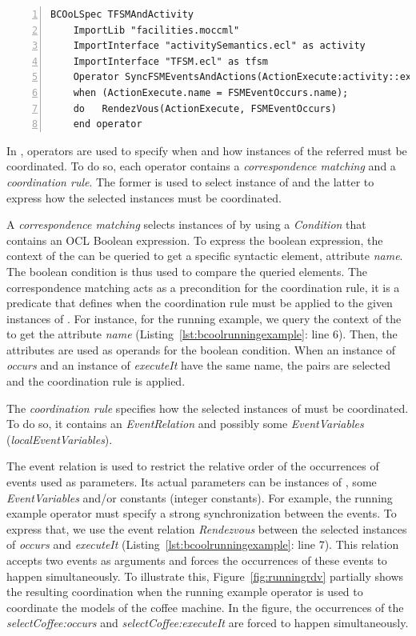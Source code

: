 	 
	\begin{lstlisting}[language=bcool,
	caption={\bcool specification of the running example operator between the TFSM and Activity languages},
	label={lst:bcoolrunningexample}, 
	basicstyle=\scriptsize\ttfamily, backgroundcolor=\color{LGrey}, numbers=left, xleftmargin=2pt]
	BCOoLSpec TFSMAndActivity
	ImportLib "facilities.moccml"
	ImportInterface "activitySemantics.ecl" as activity
	ImportInterface "TFSM.ecl" as tfsm
	Operator SyncFSMEventsAndActions(ActionExecute:activity::executeIt, FSMEventOccurs:tfsm::occurs)
	when (ActionExecute.name = FSMEventOccurs.name);
	do   RendezVous(ActionExecute, FSMEventOccurs)
	end operator
	\end{lstlisting}
	
In \bcool, operators are used to specify when and how instances of the referred \dse must be coordinated. To do so, each operator contains a \emph{correspondence matching} and a \emph{coordination rule}. The former is used to select instance of \dse and the latter to express how the selected instances must be coordinated. 
	
A \emph{correspondence matching} selects instances of \dse by using a \emph{Condition} that contains an OCL Boolean expression. To express the boolean expression, the context of the \dse can be queried to get a specific syntactic element, \eg attribute \emph{name}. The boolean condition is thus used to compare the queried elements. The correspondence matching acts as a precondition for the coordination rule, \ie it is a predicate that defines when the coordination rule must be applied to the given instances of \dse. For instance, for the running example, we query the context of the \dse to get the attribute \emph{name} (Listing~\ref{lst:bcoolrunningexample}: line 6). Then, the attributes are used as operands for the boolean condition. When an instance of \dse \emph{occurs} and an instance of \dse \emph{executeIt} have the same name, the pairs are selected and the coordination rule is applied.
	
The \emph{coordination rule} specifies how the selected instances of \dse must be coordinated. To do so, it contains an \emph{EventRelation} and possibly some \emph{EventVariables} (\emph{localEventVariables}).    	
	
The event relation is used to restrict the relative order of the occurrences of events used as parameters. Its actual parameters can be instances of \dse, some \emph{EventVariables} and/or constants (\eg integer constants). For example, the running example operator must specify a strong synchronization between the events. To express that, we use the event relation \emph{Rendezvous} between the selected instances of \dse \emph{occurs} and \emph{executeIt} (Listing~\ref{lst:bcoolrunningexample}: line 7). This relation accepts two events as arguments and forces the occurrences of these events to happen simultaneously. To illustrate this, Figure~\ref{fig:runningrdv} partially shows the resulting coordination when the running example operator is used to coordinate the models of the coffee machine. In the figure, the occurrences of the \mse \emph{selectCoffee:occurs} and \emph{selectCoffee:executeIt} are forced to happen simultaneously.   
	
